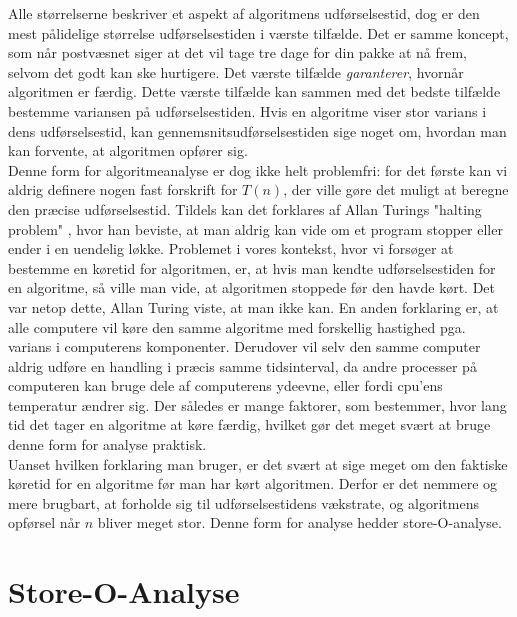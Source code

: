 Alle størrelserne beskriver et aspekt af algoritmens udførselsestid, dog er den mest pålidelige størrelse udførselsestiden i værste tilfælde. Det er samme koncept, som når postvæsnet siger at det vil tage tre dage for din pakke at nå frem, selvom det godt kan ske hurtigere. Det værste tilfælde \emph{garanterer}, hvornår algoritmen er færdig. Dette værste tilfælde kan sammen med det bedste tilfælde bestemme variansen på udførselsestiden. Hvis en algoritme viser stor varians i dens udførselsestid, kan gennemsnitsudførselsestiden sige noget om, hvordan man kan forvente, at algoritmen opfører sig.\\

Denne form for algoritmeanalyse er dog ikke helt problemfri: for det første kan vi aldrig definere nogen fast forskrift for $T(n)$, der ville gøre det muligt at beregne den præcise udførselsestid. Tildels kan det forklares af Allan Turings "halting problem" \cite{halting-problem}, hvor han beviste, at man aldrig kan vide om et program stopper eller ender i en uendelig løkke. Problemet i vores kontekst, hvor vi forsøger at bestemme en køretid for algoritmen, er, at hvis man kendte udførselsestiden for en algoritme, så ville man vide, at algoritmen stoppede før den havde kørt. Det var netop dette, Allan Turing viste, at man ikke kan. En anden forklaring er, at alle computere vil køre den samme algoritme med forskellig hastighed pga. varians i computerens komponenter. Derudover vil selv den samme computer aldrig udføre en handling i præcis samme tidsinterval, da andre processer på computeren kan bruge dele af computerens ydeevne, eller fordi cpu'ens temperatur ændrer sig. Der således er mange faktorer, som bestemmer, hvor lang tid det tager en algoritme at køre færdig, hvilket gør det meget svært at bruge denne form for analyse praktisk.\\

Uanset hvilken forklaring man bruger, er det svært at sige meget om den faktiske køretid for en algoritme før man har kørt algoritmen. Derfor er det nemmere og mere brugbart, at forholde sig til udførselsestidens vækstrate, og algoritmens opførsel når $n$ bliver meget stor. Denne form for analyse hedder store-O-analyse.

\section{Store-O-Analyse}
\label{sec:Store-O-Analyse}

